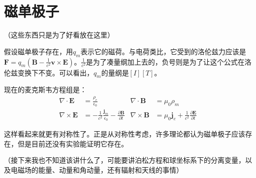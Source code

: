 \section{磁单极子}
（这些东西只是为了好看放在这里）

假设磁单极子存在，用$q_m$表示它的磁荷。与电荷类比，它受到的洛伦兹力应该是$\mathbf{F}=q_m(\mathbf{B}-\frac{1}{c^2} \mathbf{v} \times \mathbf{E})$。$\frac{1}{c^2}$是为了凑量纲加上去的，负号则是为了让这个公式在洛伦兹变换下不变。可以看出，$q_m$的量纲是$[I] [T]$。

现在的麦克斯韦方程组是：
\begin{align*}
\nabla \cdot \mathbf{E}&=\frac{\rho_e}{\epsilon_0} & \nabla \cdot \mathbf{B}&=\mu_0 \rho_m \\
\nabla \times \mathbf{E}&=-\frac{1}{c^2} \frac{\mathbf{j}_m}{\epsilon_0}-\frac{\partial \mathbf{B}}{\partial t} & \nabla \times \mathbf{B}&=\mu_0 \mathbf{j}_e+\frac{1}{c^2} \frac{\partial \mathbf{E}}{\partial t}
\end{align*}

这样看起来就更有对称性了。正是从对称性考虑，许多理论都认为磁单极子应该存在，但是目前还没有实验能证明它存在。

（接下来我也不知道该讲什么了，可能要讲泊松方程和球坐标系下的分离变量，以及电磁场的能量、动量和角动量，还有辐射和天线的事情）
